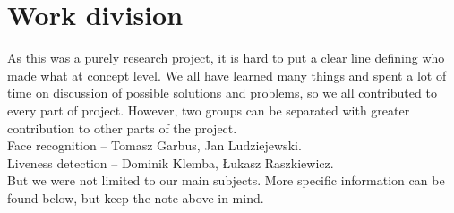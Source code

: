 \chapter{Work division}
    As this was a purely research project, it is hard to
    put a clear line defining who made what at concept level.
    We all have learned many things and spent a lot of time
    on discussion of possible solutions and problems,
    so we all contributed to every part of project.
    However, two groups can be separated
    with greater contribution to other parts of the project.\\
    Face recognition -- Tomasz Garbus, Jan Ludziejewski.\\
    Liveness detection -- Dominik Klemba, Łukasz Raszkiewicz.\\
    But we were not limited to our main subjects.
    More specific information can be found below, but keep the note above in mind.

